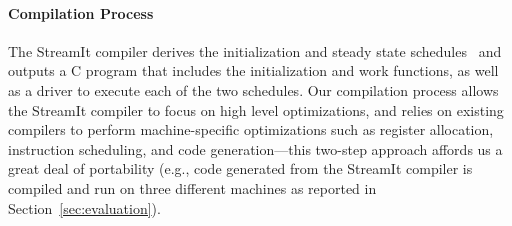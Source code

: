 \paragraph*{Compilation Process}
The StreamIt compiler derives the initialization and steady state
schedules~\cite{karczma-lctes03} and outputs a C program that includes
the initialization and work functions, as well as a driver to execute
each of the two schedules. Our compilation process allows the StreamIt
compiler to focus on high level optimizations, and relies on existing
compilers to perform machine-specific optimizations such as register
allocation, instruction scheduling, and 
code generation---this two-step approach affords us a
great deal of portability (e.g., code generated from the StreamIt
compiler is compiled and run on three different machines as reported
in Section~\ref{sec:evaluation}).


